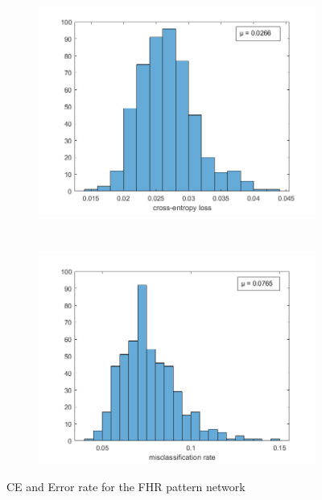 \documentclass[11pt,a4paper]{article}
\begin{document}
\begin{figure}[htb]
  \centering
  \begin{subfigure}[b]{0.48\textwidth}
    \centering
    \includegraphics[width=\textwidth]{figures/CLASS/ce_hist_500.png}
  \end{subfigure}
  ~
  \begin{subfigure}[b]{0.48\textwidth}
    \centering
    \includegraphics[width=\textwidth]{figures/CLASS/misclassification_hist_500.png}
  \end{subfigure}
  \caption{CE and Error rate for the FHR pattern network}
  \label{fig:CLASS_HIST}
\end{figure}
\end{document}
